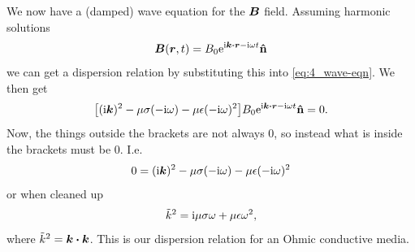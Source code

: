 \documentclass[11pt,letter, swedish, english
]{article}
\begin{document}
We now have a (damped) wave equation for the $\vb*B$ field. Assuming
harmonic solutions
\begin{equation}
\vb*B(\vb*r, t) = B_0\ee^{\ii\vb*k\vdot\vb*r - \ii\omega t}\vu{n}
\end{equation}
we can get a dispersion relation by substituting this into
\eqref{eq:4_wave-eqn}. We then get
\begin{equation}
\qty[(\ii\vb*k)^2
-\mu\sigma(-\ii\omega) - \mu\epsilon(-\ii\omega)^2
]B_0\ee^{\ii\vb*k\vdot\vb*r - \ii\omega t}\vu{n} =0.
\end{equation}
Now, the things outside the brackets are not always 0, so instead what
is inside the brackets must be 0. I.e.
\begin{equation}
0=(\mathrm{i}\vb*k)^2
-\mu\sigma(-\mathrm{i}\omega) - \mu\epsilon(-\mathrm{i}\omega)^2
\end{equation}
or when cleaned up
\begin{equation}\label{eq:4_disp}
\tilde{k}^2 = \mathrm{i}\mu\sigma\omega +\mu\epsilon\omega^2,
\end{equation}
where $\kt^2 = \vb*k\vdot\vb*k$.
This is our dispersion relation for an Ohmic conductive media. 
\end{document}
